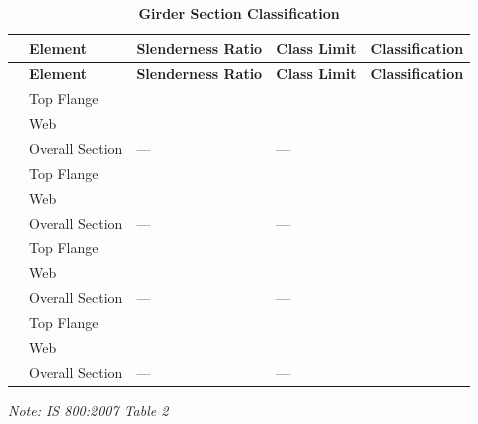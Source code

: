 \documentclass[12pt,a4paper]{report}
\numberwithin{table}{chapter}
\numberwithin{figure}{chapter}
\newcommand{\reportrowpad}{4pt}
\newcommand{\reportsectiongap}{0.75em}
\begin{document}
\vspace{\reportsectiongap}
\begin{longtable}{|C{2.5cm}|L{3cm}|C{3.5cm}|C{2.5cm}|>{\centering\arraybackslash}p{4.0cm}|}
\caption{\textbf{Girder Section Classification}}\\
\hline
\textbf{} & \textbf{Element} & \textbf{Slenderness Ratio} & \textbf{Class Limit} & \textbf{Classification} \\[\reportrowpad]
\hline
\endfirsthead
\hline
\textbf{} & \textbf{Element} & \textbf{Slenderness Ratio} & \textbf{Class Limit} & \textbf{Classification} \\[\reportrowpad]
\hline
\endhead
{} & Top Flange &  &  &  \\[\reportrowpad]
 & Web &  &  &  \\[\reportrowpad]
 & Overall Section & --- & --- &  \\[\reportrowpad]
\hline
{} & Top Flange &  &  &  \\[\reportrowpad]
 & Web &  &  &  \\[\reportrowpad]
 & Overall Section & --- & --- &  \\[\reportrowpad]
\hline
{} & Top Flange &  &  &  \\[\reportrowpad]
 & Web &  &  &  \\[\reportrowpad]
 & Overall Section & --- & --- &  \\[\reportrowpad]
\hline
{} & Top Flange &  &  &  \\[\reportrowpad]
 & Web &  &  &  \\[\reportrowpad]
 & Overall Section & --- & --- &  \\[\reportrowpad]
\hline
\end{longtable}
\noindent\textit{Note: IS 800:2007 Table 2}
\end{document}
